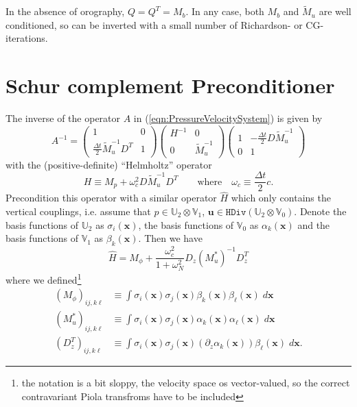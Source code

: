 \documentclass[10pt]{article}
\newcommand{\Uspace}{\mathbb{U}}
\newcommand{\Vspace}{\mathbb{V}}
\newcommand{\Hdiv}{\texttt{HDiv}}
\renewcommand{\vec}[1]{\boldsymbol{#1}}
\begin{document}
In the absence of orography, $Q=Q^T=M_b$. In any case, both $M_b$ and $\tilde{M}_u$ are well conditioned, so can be inverted with a small number of Richardson- or CG- iterations.
\section{Schur complement Preconditioner}
The inverse of the operator $A$ in (\ref{eqn:PressureVelocitySystem}) is given by
\begin{equation}
  A^{-1} = 
\begin{pmatrix}
  1 & 0 \\[1ex]
  \frac{\Delta t}{2}\tilde{M}_u^{-1} D^T & 1
\end{pmatrix}
\begin{pmatrix}
  H^{-1} & 0 \\[1ex] 0 & \tilde{M}_u^{-1}
\end{pmatrix}
\begin{pmatrix}
  1 & -\frac{\Delta t}{2}D\tilde{M}_u^{-1} \\[1ex]
  0 & 1
\end{pmatrix}
\end{equation}
with the (positive-definite) ``Helmholtz'' operator
\begin{equation}
  H \equiv M_p + \omega_c^2 D\tilde{M}_u^{-1} D^T
\qquad\text{where}\quad \omega_c \equiv \frac{\Delta t}{2}c.
\end{equation}
Precondition this operator with a similar operator $\hat{H}$ which only contains the vertical couplings, i.e. assume that $p\in \Uspace_2\otimes \Vspace_1$, $\vec{u}\in \Hdiv(\Uspace_2\otimes\Vspace_0)$. Denote the basis functions of $\Uspace_2$ as $\sigma_i(\vec{x})$, the basis functions of $\Vspace_0$ as $\alpha_k(\vec{x})$ and the basis functions of $\Vspace_1$ as $\beta_k(\vec{x})$. Then we have
\begin{equation}
  \hat{H} = M_{\phi} + \frac{\omega_c^2}{1+\omega_N^2}D_z\left(M^*_{u}\right)^{-1} D_z^T
\label{eqn:Preconditioner}
\end{equation}
where we defined\footnote{the notation is a bit sloppy, the velocity space os vector-valued, so the correct contravariant Piola transfroms have to be included}
\begin{equation}
 \begin{aligned}
   \left(M_\phi\right)_{ij,k\ell} &\equiv 
   \int \sigma_i(\vec{x})\sigma_j(\vec{x})
   \beta_k(\vec{x})\beta_\ell(\vec{x})
   \;d\vec{x}\\[1ex]
   \left(M^*_{u}\right)_{ij,k\ell} &\equiv 
   \int \sigma_i(\vec{x})\sigma_j(\vec{x})
   \alpha_k(\vec{x})\alpha_\ell(\vec{x})
   \;d\vec{x}\\[1ex]
   \left(D_z^T\right)_{ij,k\ell} &\equiv 
   \int \sigma_i(\vec{x})\sigma_j(\vec{x})
   (\partial_z\alpha_k(\vec{x}))\beta_\ell(\vec{x})
   \;d\vec{x}.
 \end{aligned}
\end{equation}
\end{document}
